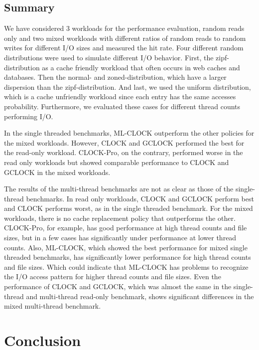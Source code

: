 \documentclass[
	12pt,
	a4paper,
	abstract,
	bibliography=totoc,
	chapterprefix,
	headings=openright,
	numbers=endperiod,
	parskip=half,
	twoside,
]{scrreprt}
\begin{document}
\section{Summary}

We have considered 3 workloads for the performance evaluation,
random reads only and two mixed workloads with different ratios of random reads to random writes for different I/O sizes
and measured the hit rate.
Four different random distributions were used to simulate different I/O behavior.
First, the zipf-distribution as a cache friendly workload that often occurs in web caches and databases.
Then the normal- and zoned-distribution, which have a larger dispersion than the zipf-distribution.
And last, we used the uniform distribution, which is a cache unfriendly workload since each entry
has the same accesses probability.
Furthermore, we evaluated these cases for different thread counts performing I/O.

In the single threaded benchmarks, ML-CLOCK outperform the other policies for the mixed workloads.
However, CLOCK and GCLOCK performed the best for the read-only workload.
CLOCK-Pro, on the contrary, performed worse in the read only workloads 
but showed comparable performance to CLOCK and GCLOCK in the mixed workloads.

The results of the multi-thread benchmarks are not as clear as those of the single-thread benchmarks.
In read only workloads, CLOCK and GCLOCK perform best and CLOCK performs worst, as in the single threaded benchmark.
For the mixed workloads, there is no cache replacement policy that outperforms the other.
CLOCK-Pro, for example, has good performance at high thread counts and file sizes, but in a few cases has significantly 
under performance at lower thread counts.
Also, ML-CLOCK, which showed the best performance for mixed single threaded benchmarks, has 
significantly lower performance for high thread counts and file sizes.
Which could indicate that ML-CLOCK has problems to recognize the I/O access pattern for higher thread counts and file sizes.
Even the performance of CLOCK and GCLOCK, which was almost the same in the single-thread and multi-thread read-only benchmark, shows significant 
differences in the mixed multi-thread benchmark.

\chapter{Conclusion}
\label{cha:conclusion}
\end{document}
